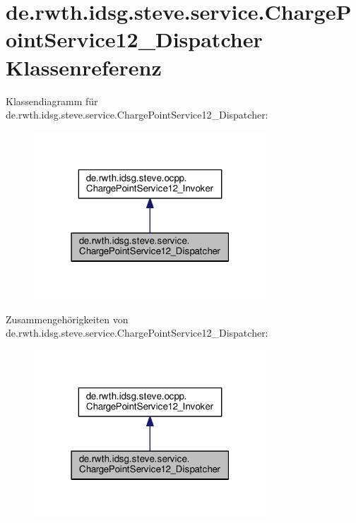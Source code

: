 \hypertarget{classde_1_1rwth_1_1idsg_1_1steve_1_1service_1_1_charge_point_service12___dispatcher}{\section{de.\+rwth.\+idsg.\+steve.\+service.\+Charge\+Point\+Service12\+\_\+\+Dispatcher Klassenreferenz}
\label{classde_1_1rwth_1_1idsg_1_1steve_1_1service_1_1_charge_point_service12___dispatcher}
}


Klassendiagramm für de.\+rwth.\+idsg.\+steve.\+service.\+Charge\+Point\+Service12\+\_\+\+Dispatcher\+:\nopagebreak
\begin{figure}[H]
\begin{center}
\leavevmode
\includegraphics[width=247pt]{classde_1_1rwth_1_1idsg_1_1steve_1_1service_1_1_charge_point_service12___dispatcher__inherit__graph}
\end{center}
\end{figure}


Zusammengehörigkeiten von de.\+rwth.\+idsg.\+steve.\+service.\+Charge\+Point\+Service12\+\_\+\+Dispatcher\+:\nopagebreak
\begin{figure}[H]
\begin{center}
\leavevmode
\includegraphics[width=247pt]{classde_1_1rwth_1_1idsg_1_1steve_1_1service_1_1_charge_point_service12___dispatcher__coll__graph}
\end{center}
\end{figure}
